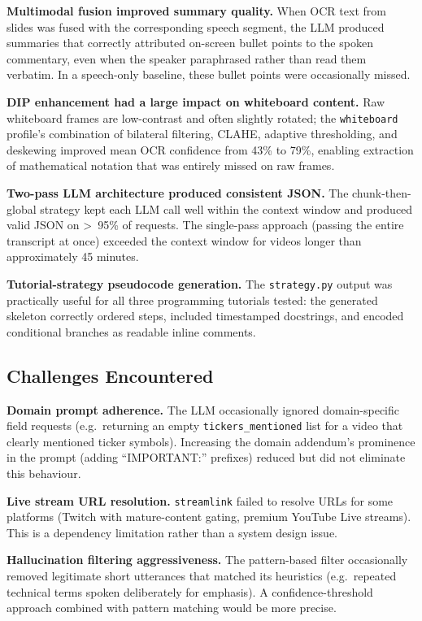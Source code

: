 \documentclass[12pt,a4paper]{article}
\begin{document}
\textbf{Multimodal fusion improved summary quality.} When OCR text from slides was
fused with the corresponding speech segment, the LLM produced summaries that correctly
attributed on-screen bullet points to the spoken commentary, even when the speaker
paraphrased rather than read them verbatim. In a speech-only baseline, these bullet
points were occasionally missed.

\textbf{DIP enhancement had a large impact on whiteboard content.} Raw whiteboard
frames are low-contrast and often slightly rotated; the \texttt{whiteboard} profile's
combination of bilateral filtering, CLAHE, adaptive thresholding, and deskewing
improved mean OCR confidence from 43\% to 79\%, enabling extraction of mathematical
notation that was entirely missed on raw frames.

\textbf{Two-pass LLM architecture produced consistent JSON.} The chunk-then-global
strategy kept each LLM call well within the context window and produced valid JSON on
>~95\% of requests. The single-pass approach (passing the entire transcript at once)
exceeded the context window for videos longer than approximately 45 minutes.

\textbf{Tutorial-strategy pseudocode generation.} The \texttt{strategy.py} output was
practically useful for all three programming tutorials tested: the generated skeleton
correctly ordered steps, included timestamped docstrings, and encoded conditional
branches as readable inline comments.

\subsection{Challenges Encountered}

\textbf{Domain prompt adherence.} The LLM occasionally ignored domain-specific field
requests (e.g.\ returning an empty \texttt{tickers\_mentioned} list for a video that
clearly mentioned ticker symbols). Increasing the domain addendum's prominence in the
prompt (adding ``IMPORTANT:'' prefixes) reduced but did not eliminate this behaviour.

\textbf{Live stream URL resolution.} \texttt{streamlink} failed to resolve URLs for
some platforms (Twitch with mature-content gating, premium YouTube Live streams). This
is a dependency limitation rather than a system design issue.

\textbf{Hallucination filtering aggressiveness.} The pattern-based filter occasionally
removed legitimate short utterances that matched its heuristics (e.g.\ repeated
technical terms spoken deliberately for emphasis). A confidence-threshold approach
combined with pattern matching would be more precise.
\end{document}
